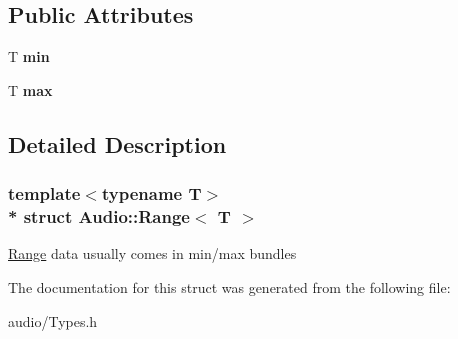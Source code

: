 \subsection*{Public Attributes}
\begin{DoxyCompactItemize}
\item 
T {\bfseries min}\hypertarget{structAudio_1_1Range_a5b3d889f9d13b7ba2ca2a63dcc23d891}{}\label{structAudio_1_1Range_a5b3d889f9d13b7ba2ca2a63dcc23d891}

\item 
T {\bfseries max}\hypertarget{structAudio_1_1Range_a192cd3cf88ca906e56375a0d8b58d46c}{}\label{structAudio_1_1Range_a192cd3cf88ca906e56375a0d8b58d46c}

\end{DoxyCompactItemize}


\subsection{Detailed Description}
\subsubsection*{template$<$typename T$>$\\*
struct Audio\+::\+Range$<$ T $>$}

\hyperlink{structAudio_1_1Range}{Range} data usually comes in min/max bundles 

The documentation for this struct was generated from the following file\+:\begin{DoxyCompactItemize}
\item 
audio/Types.\+h\end{DoxyCompactItemize}
